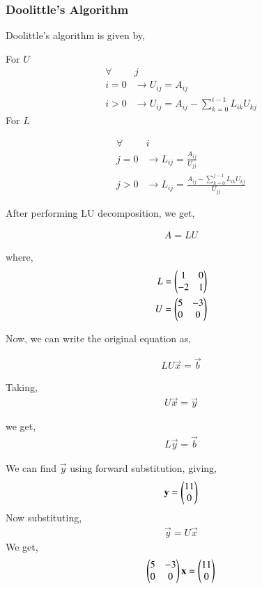\documentclass[journal]{IEEEtran}
\begin{document}
    \subsubsection{Doolittle's Algorithm}

    Doolittle's algorithm is given by,

    For $U$
    \begin{align}
        \forall &j\\
        i = 0 &\to U_{ij} = A_{ij}\\
        i > 0 &\to U_{ij} = A_{ij} - \sum_{k=0}^{i-1}L_{ik}U_{kj}
    \end{align}
    For $L$

    \begin{align}
        \forall &i\\
        j=0 &\to L_{ij} = \frac{A_{ij}}{U_{jj}}\\
        j>0 &\to L_{ij} = \frac{A_{ij} - \sum_{k=0}^{j-1}L_{ik}U_{kj}}{U_{jj}}
    \end{align}

    After performing LU decomposition, we get,

    \begin{align}
        A = LU
    \end{align}

    where,
    \begin{align}
        L = \begin{pmatrix}1 & 0\\-2 & 1\end{pmatrix}\\
        U = \begin{pmatrix}5 & -3\\0 & 0\end{pmatrix}
    \end{align}

    Now, we can write the original equation as,

    \begin{align}
        LU\vec{x} = \vec{b}
    \end{align}

    Taking,
    \begin{align}
        U\vec{x} = \vec{y}
    \end{align}

    we get,
    \begin{align}
        L\vec{y} = \vec{b}
    \end{align}

    We can find $\vec{y}$ using forward substitution, giving,
    \begin{align}
        \mathbf{y} = \begin{pmatrix}11\\0\end{pmatrix}
    \end{align}
    Now substituting,
    \begin{align}
        \vec{y} = U\vec{x}
    \end{align}
    We get,
    \begin{align}
        \begin{pmatrix}5 & -3\\0 & 0\end{pmatrix}\mathbf{x} = \begin{pmatrix}11\\0\end{pmatrix}
    \end{align}
\end{document}
